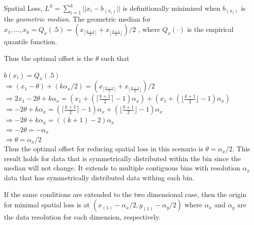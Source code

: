 \documentclass[11pt]{isuthesis}\usepackage[]{graphicx}\usepackage[]{color}
\begin{document}
\begin{appendices}
Spatial Loss, $L^S = \sum_{i=1}^{k} ||x_i-b_(x_i)|| $ is definitionally minimized when $b_(x_i)$ is the \textit{geometric median}. The geometric median for $x_1, \dots, x_k = Q_x(.5) = (x_{\lceil\frac{k+1}{2}\rceil}+x_{\lfloor \frac{k+1}{2}\rfloor})/2$ , where $Q_x(\cdot)$ is the empirical quantile function. 

Thus the optimal offset is the $\theta$ such that

$ b(x_i) = Q_x(.5) $ \\
$ \Rightarrow (x_1 - \theta) + (k\alpha_x/2) = (x_{\lceil\frac{k+1}{2}\rceil}+x_{\lfloor \frac{k+1}{2}\rfloor})/2 $ \\
$ \Rightarrow 2x_1 - 2\theta + k\alpha_x = (x_1 + (\lceil\frac{k+1}{2}\rceil - 1)\alpha_x ) + (x_1 + (\lfloor\frac{k+1}{2}\rfloor - 1)\alpha_x ) $ \\
$ \Rightarrow -2\theta + k\alpha_x = (\lceil\frac{k+1}{2}\rceil - 1)\alpha_x  + (\lfloor\frac{k+1}{2}\rfloor - 1)\alpha_x  $ \\
$ \Rightarrow -2\theta + k\alpha_x = ((k+1) - 2)\alpha_x  $ \\
$ \Rightarrow -2\theta = -\alpha_x $ \\
$ \Rightarrow \theta = \alpha_x/2 $ \\

Thus the optimal offset for reducing spatial loss in this scenario is $\theta = \alpha_x/2$.  This result holds for data that is symmetrically distributed within the bin since the median will not change.  It extends to multiple contiguous bins with resolution $\alpha_x$ data that has symmetrically distributed data withing each bin. 

If the same conditions are extended to the two dimensional case, then the origin for minimal spatial loss is at $(x_{(1)}-\alpha_x/2, y_{(1)}-\alpha_y/2)$ where $\alpha_x$ and $\alpha_y$  are the data resolution for each dimension, respectively. 
\end{appendices}

% 
% 


\end{document}
